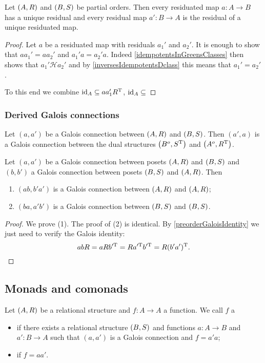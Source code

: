 \begin{proposition}
Let $\left( A,R \right)$ and $\left( B,S \right)$ be partial orders. Then every residuated map $a: A \to B$ has a unique residual and every residual map $a': B \to A$ is the residual of a unique residuated map.
\end{proposition}
\begin{proof}
Let $a$ be a residuated map with residuals $a_1'$ and $a_2'$. It is enough to show that $aa_1' = aa_2'$ and $a_1'a = a_2'a$. Indeed \ref{idempotentsInGreensClasses} then shows that $a_1'\mathcal{H}a_2'$ and by \ref{inversesIdempotentsDclass} this means that $a_1' = a_2'$.

To this end we combine $\operatorname{id}_A \subseteq aa_1'R^{\mathrm{T}}$, $\operatorname{id}_A \subseteq $
\end{proof}

\subsubsection{Derived Galois connections}
\begin{lemma}
Let $(a, a')$ be a Galois connection between $\left( A,R \right)$ and $\left( B,S \right)$. Then $(a',a)$ is a Galois connection between the dual structures $\left( B^o,S^{\mathrm{T}} \right)$ and $\left( A^o,R^{\mathrm{T}} \right)$.
\end{lemma}

\begin{lemma}
Let $(a, a')$ be a Galois connection between posets $\left( A,R \right)$ and $\left( B,S \right)$ and $(b, b')$ a Galois connection between posets $\left( B,S \right)$ and $\left( A,R \right)$. Then
\begin{enumerate}
\item $(ab, b'a')$ is a Galois connection between $\left( A,R \right)$ and $\left( A,R \right)$;
\item $(ba, a'b')$ is a Galois connection between $\left( B,S \right)$ and $\left( B,S \right)$.
\end{enumerate}
\end{lemma}
\begin{proof}
We prove (1). The proof of (2) is identical.
By \ref{preorderGaloisIdentity} we just need to verify the Galois identity:
\[ abR = aRb^{\prime\mathrm{T}} = Ra^{\prime\mathrm{T}}b^{\prime\mathrm{T}} = R(b'a')^{\mathrm{T}}. \]
\end{proof}

\subsection{Monads and comonads}
\begin{definition}
Let $\left( A,R \right)$ be a relational structure and $f: A\to A$ a function. We call $f$ a
\begin{itemize}
\item {} if there exists a relational structure $\left( B,S \right)$ and functions $a: A\to B$ and $a': B\to A$ such that $(a, a')$ is a Galois connection and $f = a'a$;
\item {} if $f = aa'$.
\end{itemize}
\end{definition}

